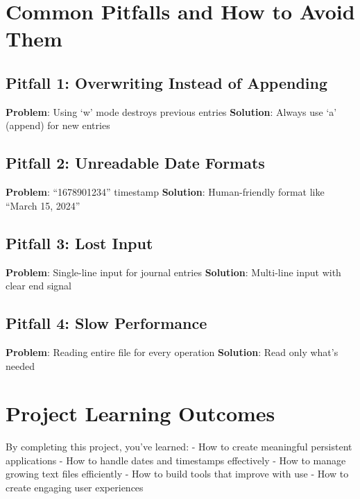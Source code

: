 \documentclass[
  letterpaper,
  DIV=11,
  numbers=noendperiod,
  oneside]{scrreprt}
\begin{document}
\section{Common Pitfalls and How to Avoid
Them}\label{common-pitfalls-and-how-to-avoid-them-6}

\subsection{Pitfall 1: Overwriting Instead of
Appending}\label{pitfall-1-overwriting-instead-of-appending}

\textbf{Problem}: Using `w' mode destroys previous entries
\textbf{Solution}: Always use `a' (append) for new entries

\subsection{Pitfall 2: Unreadable Date
Formats}\label{pitfall-2-unreadable-date-formats}

\textbf{Problem}: ``1678901234'' timestamp \textbf{Solution}:
Human-friendly format like ``March 15, 2024''

\subsection{Pitfall 3: Lost Input}\label{pitfall-3-lost-input}

\textbf{Problem}: Single-line input for journal entries
\textbf{Solution}: Multi-line input with clear end signal

\subsection{Pitfall 4: Slow
Performance}\label{pitfall-4-slow-performance}

\textbf{Problem}: Reading entire file for every operation
\textbf{Solution}: Read only what's needed

\section{Project Learning Outcomes}\label{project-learning-outcomes-6}

By completing this project, you've learned: - How to create meaningful
persistent applications - How to handle dates and timestamps effectively
- How to manage growing text files efficiently - How to build tools that
improve with use - How to create engaging user experiences
\end{document}
